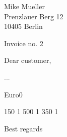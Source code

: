 \documentclass{letter}
\date{31-May-2010}
\begin{document}
 
\begin{letter}{Mike Mueller \\ 
               Prenzlauer Berg 12 \\ 
               10405 Berlin} 
\opening{Invoice no. 2} 
Dear customer,

... 

\begin{invoice}{Euro}{0} 

     {150} {1} 
     {500} {1} 
     {350} {1} 

\end{invoice} 

\closing{Best regards} 
\end{letter} 
\end{document}
